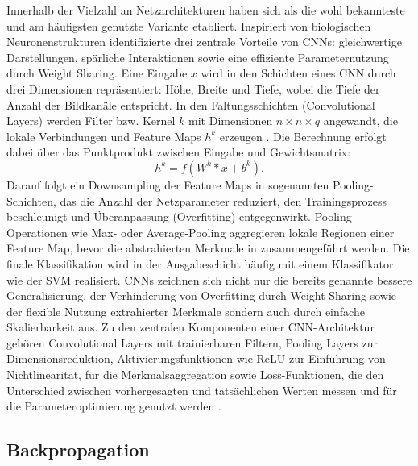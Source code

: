 Innerhalb der Vielzahl an Netzarchitekturen haben sich  als die wohl bekannteste und am häufigsten genutzte Variante etabliert. Inspiriert von biologischen Neuronenstrukturen identifizierte \cite{Goodfellow-et-al-2016} drei zentrale Vorteile von CNNs: gleichwertige Darstellungen, spärliche Interaktionen sowie eine effiziente Parameternutzung durch Weight Sharing. Eine Eingabe $x$ wird in den Schichten eines CNN durch drei Dimensionen repräsentiert: Höhe, Breite und Tiefe, wobei die Tiefe der Anzahl der Bildkanäle entspricht. In den Faltungsschichten (Convolutional Layers) werden Filter bzw. Kernel $k$ mit Dimensionen $n \times n \times q$ angewandt, die lokale Verbindungen und Feature Maps $h^k$ erzeugen \cite{Alzubaidi2021}. Die Berechnung erfolgt dabei über das Punktprodukt zwischen Eingabe und Gewichtsmatrix:  
\begin{equation}
h^k = f(W^k \ast x + b^k).
\end{equation}
Darauf folgt ein Downsampling der Feature Maps in sogenannten Pooling-Schichten, das die Anzahl der Netzparameter reduziert, den Trainingsprozess beschleunigt und Überanpassung (Overfitting) entgegenwirkt. Pooling-Operationen wie Max- oder Average-Pooling aggregieren lokale Regionen einer Feature Map, bevor die abstrahierten Merkmale in  zusammengeführt werden. Die finale Klassifikation wird in der Ausgabeschicht häufig mit einem Klassifikator wie der \acrfull{SVM} realisiert. CNNs zeichnen sich nicht nur die bereits genannte bessere Generalisierung, der Verhinderung von Overfitting durch Weight Sharing sowie der flexible Nutzung extrahierter Merkmale sondern auch durch einfache Skalierbarkeit aus. Zu den zentralen Komponenten einer \acrshort{CNN}-Architektur gehören Convolutional Layers mit trainierbaren Filtern, Pooling Layers zur Dimensionsreduktion, Aktivierungsfunktionen wie \acrfull{ReLU} zur Einführung von Nichtlinearität,  für die Merkmalsaggregation sowie Loss-Funktionen, die den Unterschied zwischen vorhergesagten und tatsächlichen Werten messen und für die Parameteroptimierung genutzt werden \cite{Alzubaidi2021}.

 

\subsection{Backpropagation}

